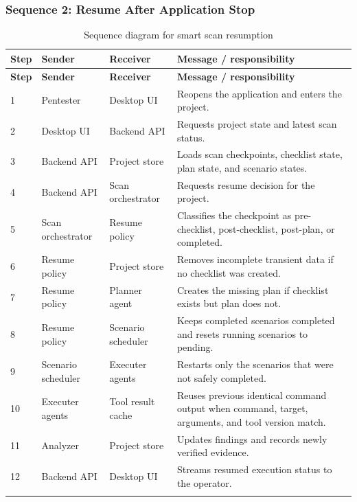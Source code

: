 \documentclass[12pt,a4paper]{report}
\begin{document}
\subsubsection{Sequence 2: Resume After Application Stop}

\begin{longtable}{|p{}|p{}|p{}|p{}|}
\hline
\textbf{Step} & \textbf{Sender} & \textbf{Receiver} & \textbf{Message / responsibility} \\
\hline
\endfirsthead
\hline
\textbf{Step} & \textbf{Sender} & \textbf{Receiver} & \textbf{Message / responsibility} \\
\hline
\endhead
1 & Pentester & Desktop UI & Reopens the application and enters the project. \\
\hline
2 & Desktop UI & Backend API & Requests project state and latest scan status. \\
\hline
3 & Backend API & Project store & Loads scan checkpoints, checklist state, plan state, and scenario states. \\
\hline
4 & Backend API & Scan orchestrator & Requests resume decision for the project. \\
\hline
5 & Scan orchestrator & Resume policy & Classifies the checkpoint as pre-checklist, post-checklist, post-plan, or completed. \\
\hline
6 & Resume policy & Project store & Removes incomplete transient data if no checklist was created. \\
\hline
7 & Resume policy & Planner agent & Creates the missing plan if checklist exists but plan does not. \\
\hline
8 & Resume policy & Scenario scheduler & Keeps completed scenarios completed and resets running scenarios to pending. \\
\hline
9 & Scenario scheduler & Executer agents & Restarts only the scenarios that were not safely completed. \\
\hline
10 & Executer agents & Tool result cache & Reuses previous identical command output when command, target, arguments, and tool version match. \\
\hline
11 & Analyzer & Project store & Updates findings and records newly verified evidence. \\
\hline
12 & Backend API & Desktop UI & Streams resumed execution status to the operator. \\
\hline
\caption{Sequence diagram for smart scan resumption}
\label{tab:seq_resume}
\end{longtable}
\end{document}
